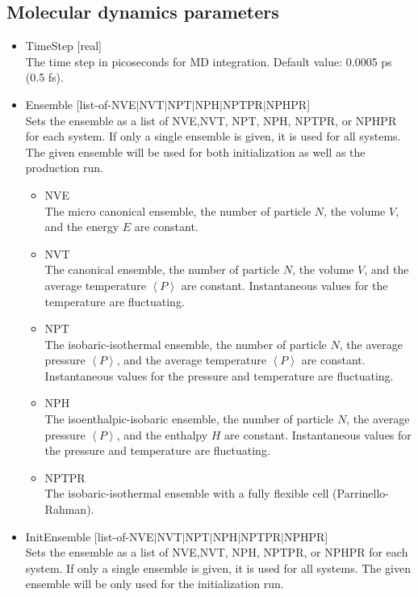 \subsection*{Molecular dynamics parameters}
\begin{itemize}
\item{TimeStep [real]}\\
The time step in picoseconds for MD integration. Default value: 0.0005 ps (0.5 fs).
\item{Ensemble [list-of-{\scriptsize NVE$|$NVT$|$NPT$|$NPH$|$NPTPR$|$NPHPR}]}\\
Sets the ensemble as a list of NVE,NVT, NPT, NPH, NPTPR, or NPHPR for each system. If only a single ensemble is given, it is used for all systems.
The given ensemble will be used for both initialization as well as the production run.
\begin{itemize}
\item{NVE}\\
The micro canonical ensemble, the number of particle $N$, the volume $V$, and the energy $E$ are constant.
\item{NVT}\\
The canonical ensemble, the number of particle $N$, the volume $V$, and the average temperature $\left\langle P\right\rangle$
are constant. Instantaneous values for the temperature are fluctuating.
\item{NPT}\\
The isobaric-isothermal ensemble, the number of particle $N$, the average pressure $\left\langle P\right\rangle$, and the average temperature $\left\langle P\right\rangle$
are constant. Instantaneous values for the pressure and temperature are fluctuating.
\item{NPH}\\
The isoenthalpic-isobaric ensemble, the number of particle $N$, the average pressure $\left\langle P\right\rangle$, and the enthalpy $H$
are constant. Instantaneous values for the pressure and temperature are fluctuating.
\item{NPTPR}\\
The isobaric-isothermal ensemble with a fully flexible cell (Parrinello-Rahman).
\end{itemize}
\item{InitEnsemble [list-of-{\scriptsize NVE$|$NVT$|$NPT$|$NPH$|$NPTPR$|$NPHPR}]}\\
Sets the ensemble as a list of NVE,NVT, NPH, NPTPR, or NPHPR for each system. If only a single ensemble is given, it is used for all systems.
The given ensemble will be only used for the initialization run.

\end{itemize}
